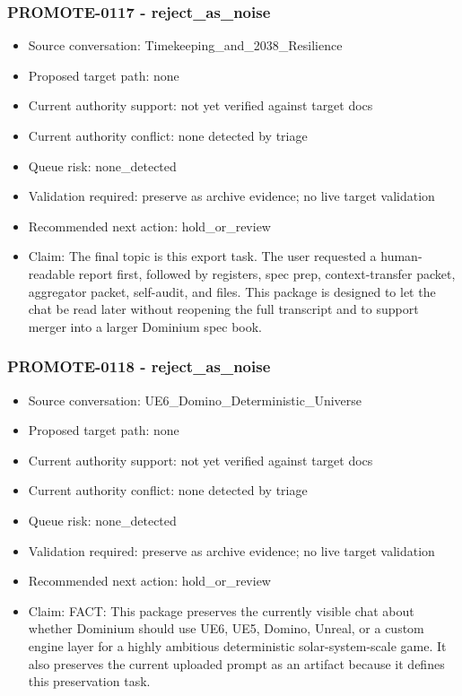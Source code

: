 \documentclass[11pt,a4paper]{report}
\begin{document}
\subsubsection{PROMOTE-0117 - reject\_as\_noise}

\begin{itemize}
\item Source conversation: Timekeeping\_and\_2038\_Resilience
\item Proposed target path: none
\item Current authority support: not yet verified against target docs
\item Current authority conflict: none detected by triage
\item Queue risk: none\_detected
\item Validation required: preserve as archive evidence; no live target validation
\item Recommended next action: hold\_or\_review
\item Claim: The final topic is this export task. The user requested a human-readable report first, followed by registers, spec prep, context-transfer packet, aggregator packet, self-audit, and files. This package is designed to let the chat be read later without reopening the full transcript and to support merger into a larger Dominium spec book.
\end{itemize}

\subsubsection{PROMOTE-0118 - reject\_as\_noise}

\begin{itemize}
\item Source conversation: UE6\_Domino\_Deterministic\_Universe
\item Proposed target path: none
\item Current authority support: not yet verified against target docs
\item Current authority conflict: none detected by triage
\item Queue risk: none\_detected
\item Validation required: preserve as archive evidence; no live target validation
\item Recommended next action: hold\_or\_review
\item Claim: FACT: This package preserves the currently visible chat about whether Dominium should use UE6, UE5, Domino, Unreal, or a custom engine layer for a highly ambitious deterministic solar-system-scale game. It also preserves the current uploaded prompt as an artifact because it defines this preservation task.
\end{itemize}
\end{document}
